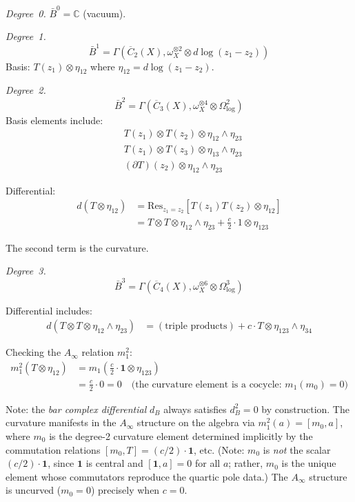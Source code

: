 \begin{computation}
\emph{Degree~0.} $\bar{B}^0 = \mathbb{C}$ (vacuum).

\emph{Degree~1.}
\begin{equation}
\bar{B}^1 = \Gamma(\overline{C}_2(X), \omega_X^{\otimes 2} \otimes d\log(z_1-z_2))
\end{equation}
Basis: $T(z_1) \otimes \eta_{12}$ where $\eta_{12} = d\log(z_1-z_2)$.

\emph{Degree~2.}
\begin{equation}
\bar{B}^2 = \Gamma(\overline{C}_3(X), \omega_X^{\otimes 4} \otimes \Omega^2_{\log})
\end{equation}
Basis elements include:
\begin{align}
&T(z_1) \otimes T(z_2) \otimes \eta_{12} \wedge \eta_{23} \\
&T(z_1) \otimes T(z_3) \otimes \eta_{13} \wedge \eta_{23} \\
&(\partial T)(z_2) \otimes \eta_{12} \wedge \eta_{23}
\end{align}

Differential:
\begin{align}
d(T \otimes \eta_{12}) &= \mathrm{Res}_{z_1=z_2}[T(z_1)T(z_2) \otimes \eta_{12}] \\
&= T \otimes T \otimes \eta_{12} \wedge \eta_{23} + \frac{c}{2} \cdot 1 \otimes \eta_{123}
\end{align}

The second term is the curvature.

\emph{Degree~3.}
\begin{equation}
\bar{B}^3 = \Gamma(\overline{C}_4(X), \omega_X^{\otimes 6} \otimes \Omega^3_{\log})
\end{equation}

Differential includes:
\begin{align}
d(T \otimes T \otimes \eta_{12} \wedge \eta_{23}) &= (\text{triple products}) + c \cdot T \otimes \eta_{123} \wedge \eta_{34}
\end{align}

Checking the $A_\infty$ relation $m_1^2$:
\begin{align}
m_1^2(T \otimes \eta_{12}) &= m_1\!\left(\frac{c}{2} \cdot \mathbf{1} \otimes \eta_{123}\right) \\
&= \frac{c}{2} \cdot 0 = 0 \quad \text{(the curvature element is a cocycle: } m_1(m_0) = 0\text{)}
\end{align}

Note: the \emph{bar complex differential} $d_B$ always satisfies $d_B^2 = 0$ by construction.  The curvature manifests in the $A_\infty$ structure on the algebra via $m_1^2(a) = [m_0, a]$, where $m_0$ is the degree-2 curvature element determined implicitly by the commutation relations $[m_0, T] = (c/2)\cdot\mathbf{1}$, etc.  (Note: $m_0$ is \emph{not} the scalar $(c/2)\cdot\mathbf{1}$, since $\mathbf{1}$ is central and $[\mathbf{1}, a] = 0$ for all $a$; rather, $m_0$ is the unique element whose commutators reproduce the quartic pole data.)
The $A_\infty$ structure is uncurved ($m_0 = 0$) precisely when $c = 0$.
\end{computation}

